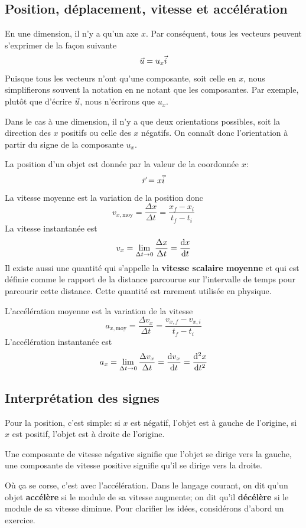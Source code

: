 \subsection{Position, déplacement, vitesse et accélération}

En une dimension, il n'y a qu'un axe $x$.  Par conséquent, tous les vecteurs
peuvent s'exprimer de la façon suivante
\[
  \vec{u} = u_x \vec{i}
\]
Puisque tous les vecteurs n'ont qu'une composante, soit celle en $x$, nous
simplifierons souvent la notation en ne notant que les composantes.  Par
exemple, plutôt que d'écrire $\vec{u}$, nous n'écrirons que $u_x$.

Dans le cas à une dimension, il n'y a que deux orientations possibles, soit la
direction des $x$ positifs ou celle des $x$ négatifs.  On connaît donc
l'orientation à partir du signe de la composante $u_x$.

La position d'un objet est donnée par la valeur de la coordonnée $x$:
\[
  \vec{r} = x \vec{i}
\]
La vitesse moyenne est la variation de la position donc
\[
  v_{x, \mathrm{moy}} = \frac{\Delta x}{\Delta t} = \frac{x_f - x_i}{t_f - t_i}
\]
La vitesse instantanée est
\[
  v_x = \lim_{\Delta t \rightarrow 0} \frac{\Delta x}{\Delta t} = \frac{\mathrm{d}x}{\mathrm{d}t}
\]
Il existe aussi une quantité qui s'appelle la \textbf{vitesse scalaire moyenne}
et qui est définie comme le rapport de la distance parcourue sur l'intervalle
de temps pour parcourir cette distance.  Cette quantité est rarement utilisée
en physique.

L'accélération moyenne est la variation de la vitesse
\[
  a_{x, \mathrm{moy}} = \frac{\Delta v_x}{\Delta t} = \frac{v_{x,f} - v_{x,i}}{t_f - t_i}
\]
L'accélération instantanée est
\[
  a_x = \lim_{\Delta t \rightarrow 0} \frac{\Delta v_x}{\Delta t} = \frac{\mathrm{d}v_x}{\mathrm{d}t} =
        \frac{\mathrm{d}{}^2x}{\mathrm{d}t^2}
\]


\subsection{Interprétation des signes}

Pour la position, c'est simple: si $x$ est négatif, l'objet est à gauche de
l'origine, si $x$ est positif, l'objet est à droite de l'origine.

Une composante de vitesse négative signifie que l'objet se dirige vers la
gauche, une composante de vitesse positive signifie qu'il se dirige vers la
droite.

Où ça se corse, c'est avec l'accélération.  Dans le langage courant, on dit
qu'un objet \textbf{accélère} si le module de sa vitesse augmente; on dit qu'il
\textbf{décélère} si le module de sa vitesse diminue.  Pour clarifier les
idées, considérons d'abord un exercice.

